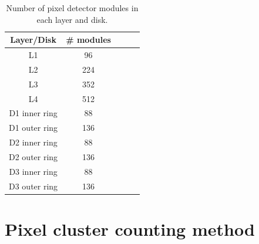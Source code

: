 \begin{table}
  \begin{center}
    \caption[Number of modules in pixel layers and disks]{Number of pixel detector modules in each layer and disk.}
    \begin{tabular}{ccccc}  
    \textbf{Layer/Disk}   & \textbf{\# modules} \\ \hline
     L1      &    96        \\  
       L2    &     224   \\ 
        L3   &       352 \\ 
         L4   &       512 \\ 
         D1 inner ring & 88     \\ 
         D1 outer ring &   136    \\ 
         D2 inner ring &      88 \\ 
         D2 outer ring &   136   \\ 
          D3 inner ring&     88  \\ 
         D3 outer ring &    136  \\ 
      \end{tabular}
    \label{tab:modpix}
  \end{center}
\end{table}


\section{Pixel cluster counting method}

